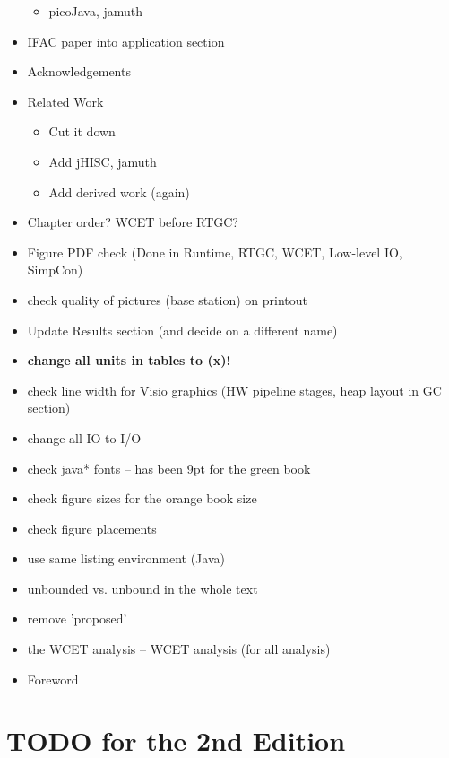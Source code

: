 \begin{itemize}
    \begin{itemize}
        \item picoJava, jamuth
    \end{itemize}
    \item IFAC paper into application section
    \item Acknowledgements
    \item Related Work
    \begin{itemize}
        \item Cut it down
        \item Add jHISC, jamuth
        \item Add derived work (again)
    \end{itemize}
  \item Chapter order? WCET before RTGC?
    \item Figure PDF check (Done in Runtime, RTGC, WCET,
        Low-level IO, SimpCon)
    \item check quality of pictures (base station) on printout
    \item Update Results section (and decide on a different name)
  \item \textbf{change all units in tables to (x)!}
    \item check line width for Visio graphics (HW pipeline
        stages, heap layout in GC section)
  \item change all IO to I/O
  \item check java* fonts -- has been 9pt for the green book
  \item check figure sizes for the orange book size
  \item check figure placements
  \item use same listing environment (Java)
  \item unbounded vs. unbound in the whole text
  \item remove 'proposed'
  \item the WCET analysis -- WCET analysis (for all analysis)
    \item Foreword
\end{itemize}

\chapter{TODO for the 2nd Edition}

